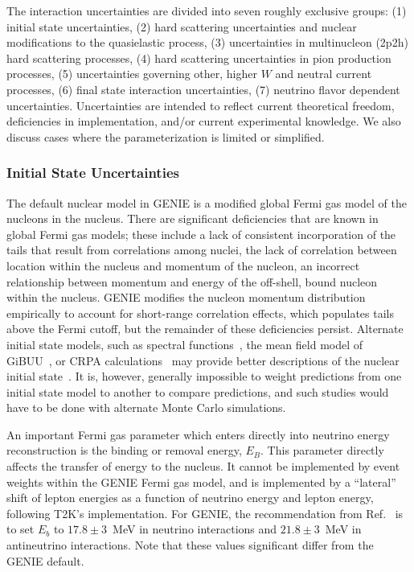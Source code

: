 The interaction uncertainties are divided into seven roughly exclusive groups: (1) initial state uncertainties, (2) hard scattering uncertainties and nuclear modifications to the quasielastic process, (3) uncertainties in multinucleon (2p2h) hard scattering processes, (4) hard scattering uncertainties in pion production processes, (5) uncertainties governing other, higher $W$ and neutral current processes, (6) final state interaction uncertainties, (7) neutrino flavor dependent uncertainties. Uncertainties are intended to reflect current theoretical freedom, deficiencies in implementation, and/or current experimental knowledge. We also discuss cases where the parameterization is limited or simplified.

\subsubsection{Initial State Uncertainties}
The default nuclear model in GENIE is a modified global Fermi gas model of the nucleons in the nucleus.  There are significant deficiencies that are known in global Fermi gas models; these include a lack of consistent incorporation of the tails that result from correlations among nuclei, the lack of correlation between location within the nucleus and momentum of the nucleon, an incorrect relationship between momentum and energy of the off-shell, bound nucleon within the nucleus. GENIE modifies the nucleon momentum distribution empirically to account for short-range correlation effects, which populates tails above the Fermi cutoff, but the remainder of these deficiencies persist. Alternate initial state models, such as spectral functions~\cite{Benhar:1994hw,Nieves:2004wx}, the mean field model of GiBUU~\cite{Gallmeister:2016dnq}, or CRPA calculations~\cite{Pandey:2014tza} may provide better descriptions of the nuclear initial state~\cite{Sobczyk:2017mts}.  It is, however, generally impossible to weight predictions from one initial state model to another to compare predictions, and such studies would have to be done with alternate Monte Carlo simulations.

An important Fermi gas parameter which enters directly into neutrino energy reconstruction is the binding or removal energy, $E_B$.  This parameter directly affects the transfer of energy to the nucleus.  It cannot be implemented by event weights within the GENIE Fermi gas model, and is implemented by a ``lateral'' shift of lepton energies as a function of neutrino energy and lepton energy, following T2K's implementation. For GENIE, the recommendation from Ref.~\cite{bodek_eb} is to set $E_b$ to $17.8\pm 3$~MeV in neutrino interactions and $21.8\pm 3$~MeV in antineutrino interactions.  Note that these values significant differ from the GENIE default.


